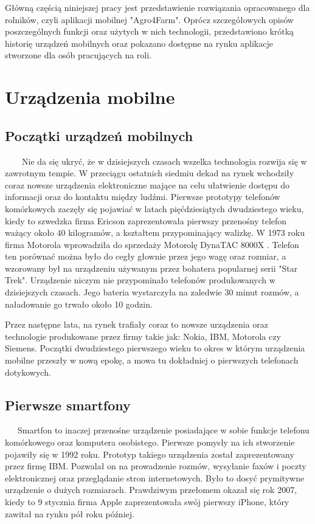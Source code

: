 \documentclass[a4paper,12pt,oneside]{book}
\begin{document}
		Główną częścią niniejszej pracy jest przedstawienie rozwiązania opracowanego dla rolników, czyli aplikacji mobilnej "Agro4Farm". Oprócz szczegółowych opisów poszczególnych funkcji oraz użytych w nich technologii, przedstawiono krótką historię urządzeń mobilnych oraz pokazano dostępne na rynku aplikacje stworzone dla osób pracujących na roli.
	
	
	\newpage
	\thispagestyle{empty}
	\chapter{Urządzenia mobilne}
	\section{Początki urządzeń mobilnych}
	\ \ \ \
	Nie da się ukryć, że w dzisiejszych czasach wszelka technologia rozwija się w zawrotnym tempie. W przeciągu ostatnich siedmiu dekad na rynek wchodziły coraz nowsze urządzenia elektroniczne mające na celu ułatwienie dostępu do informacji oraz do kontaktu między ludźmi. Pierwsze prototypy telefonów komórkowych zaczęły się pojawiać w latach pięćdziesiątych dwudziestego wieku, kiedy to szwedzka firma Ericson zaprezentowała pierwszy przenośny telefon ważący około 40 kilogramów, a kształtem przypominający walizkę. W 1973 roku firma Motorola wprowadziła do sprzedaży Motorolę DynaTAC 8000X \cite{ref1}. Telefon ten porównać można było do cegły głownie przez jego wagę oraz rozmiar, a wzorowany był na urządzeniu używanym przez bohatera popularnej serii "Star Trek". Urządzenie niczym nie przypominało telefonów produkowanych w dzisiejszych czasach. Jego bateria wystarczyła na zaledwie 30 minut rozmów, a naładowanie go trwało około 10 godzin. 
	
	Przez następne lata, na rynek trafiały coraz to nowsze urządzenia oraz technologie produkowane przez firmy takie jak: Nokia, IBM, Motorola czy Siemens. Początki dwudziestego pierwszego wieku to okres w którym urządzenia mobilne przeszły w nową epokę, a mowa tu dokładniej o pierwszych telefonach dotykowych.
	
	\section{Pierwsze smartfony}
	\ \ \ 
	Smartfon to inaczej przenośne urządzenie posiadające w sobie funkcje telefonu komórkowego oraz komputera osobistego. Pierwsze pomysły na ich stworzenie pojawiły się w 1992 roku. Prototyp takiego urządzenia został zaprezentowany przez firmę IBM. Pozwalał on na prowadzenie rozmów, wysyłanie faxów i poczty elektronicznej oraz przeglądanie stron internetowych. Było to dosyć prymitywne urządzenie o dużych rozmiarach. Prawdziwym przełomem okazał się rok 2007, kiedy to 9 stycznia firma Apple zaprezentowała swój pierwszy iPhone, który zawitał na rynku pół roku później.
	
\end{document}
